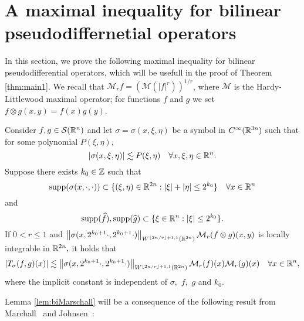 \section{A maximal inequality for bilinear pseudodiffernetial operators}\label{sec:maximal_ineq}

In this section, we prove the following maximal inequality for bilinear pseudodifferential operators, which will be usefull in the proof of Theorem \ref{thm:main1}. We recall that $\mathcal{M}_r f = \left( \mathcal{M}(|f|^r)\right)^{1/r}$, where $\mathcal{M}$ is the Hardy-Littlewood maximal operator; for functions $f$ and $g$ we set $f\otimes g (x,y) = f(x)g(y)$.  \

\begin{lemma}\label{lem:biMarschall}  Consider $f,g\in{\mathcal{S}}({{\mathbb R}^n})$  and let $\sigma=\sigma(x,\xi,\eta)$ be a  symbol in $C^\infty(\mathbb{R}^{3n})$ 
such that for some polynomial $P(\xi,\eta),$
\[
\left\vert \sigma(x,\xi,\eta) \right\vert\lesssim P(\xi,\eta)\quad \forall x,\xi,\eta\in{{\mathbb R}^n}.
\]
Suppose there exists $k_0\in\mathbb{Z}$  such that
$$
{\rm{supp}}(\sigma(x, \cdot, \cdot)) \subset \{(\xi, \eta) \in \mathbb{R}^{2n}: |\xi| + |\eta| \le 2^{k_0}\}\quad \forall x\in{{\mathbb R}^n}
$$
and 
$$
{\rm{supp}}(\widehat{f}), {\rm{supp}}(\widehat{g}) \subset \{\xi \in \mathbb{R}^{n}: |\xi| \le 2^{k_0}\}.
$$
If $0< r\le1$ and $\left\|\sigma(x, 2^{k_0+1} \cdot, 2^{k_0+1} \cdot)\right\|_{W^{\lfloor{2n/r}\rfloor + 1,1}(\mathbb{R}^{2n})} \mathcal{M}_r(f\otimes g)(x,y) $ is locally integrable in $\mathbb{R}^{2n},$ it holds that
\begin{equation}\label{eq:biMarschall}
|T_{\sigma}(f,g)(x)| \lesssim  \left\|\sigma(x, 2^{k_0+1} \cdot, 2^{k_0+1} \cdot)\right\|_{W^{\lfloor{2n/r}\rfloor + 1,1}(\mathbb{R}^{2n})} \mathcal{M}_r(f)(x) \mathcal{M}_r(g)(x) \quad \forall x \in {{\mathbb R}^n},
\end{equation}
where the implicit constant is independent of $\sigma,$  $f,$ $g$ and $k_0.$
\end{lemma}

Lemma \ref{lem:biMarschall} will be a consequence of the following result from Marchall~\cite[p.118, Proposition 5(a)]{MR1376592} and  Johnsen~\cite[p.275, Proposition 4.1]{MR2163627}:

